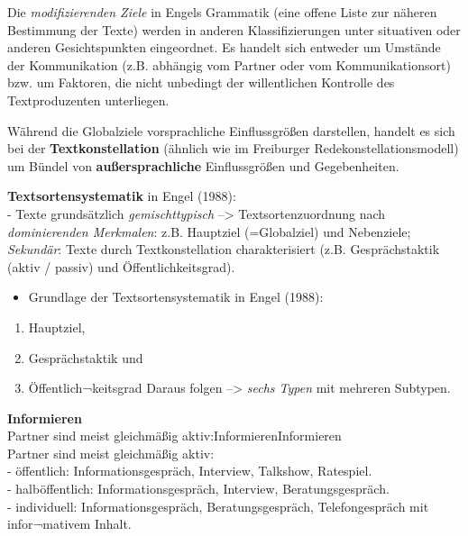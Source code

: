 \documentclass[
  letterpaper,
]{scrbook}
\providecommand{\tightlist}{%
  \setlength{\itemsep}{0pt}\setlength{\parskip}{0pt}}\usepackage{longtable,booktabs,array}
\begin{document}
Die \emph{modifizierenden Ziele} in Engels Grammatik (eine offene Liste
zur näheren Bestimmung der Texte) werden in anderen Klassifizierungen
unter situativen oder anderen Gesichtspunkten eingeordnet. Es handelt
sich entweder um Umstände der Kommunikation (z.B. abhängig vom Partner
oder vom Kommunikationsort) bzw. um Faktoren, die nicht unbedingt der
willentlichen Kontrolle des Textproduzenten unterliegen.

Während die Globalziele vorsprachliche Einflussgrößen darstellen,
handelt es sich bei der \textbf{Textkonstellation} (ähnlich wie im
Freiburger Redekonstellationsmodell) um Bündel von
\textbf{außersprachliche} Einflussgrößen und Gegebenheiten.

\textbf{Textsortensystematik} in Engel (1988):\\
- Texte grundsätzlich \emph{gemischttypisch} --\textgreater{}
Textsortenzuordnung nach \emph{dominierenden Merkmalen}: z.B. Hauptziel
(=Globalziel) und Nebenziele; \emph{Sekundär}: Texte durch
Textkonstellation charakterisiert (z.B. Gesprächstaktik (aktiv / passiv)
und Öffentlichkeitsgrad).\\

\begin{itemize}
\tightlist
\item
  Grundlage der Textsortensystematik in Engel (1988):\\
\end{itemize}

\begin{enumerate}
\def\labelenumi{(\alph{enumi})}
\tightlist
\item
  Hauptziel,\\
\item
  Gesprächstaktik und\\
\item
  Öffentlich¬keitsgrad Daraus folgen --\textgreater{} \emph{sechs Typen}
  mit mehreren Subtypen.
\end{enumerate}

\textbf{Informieren}\\
Partner sind meist gleichmäßig aktiv:InformierenInformieren\\
Partner sind meist gleichmäßig aktiv:\\
- öffentlich: Informationsgespräch, Interview, Talkshow, Ratespiel.\\
- halböffentlich: Informationsgespräch, Interview, Beratungsgespräch.\\
- individuell: Informationsgespräch, Beratungsgespräch, Telefongespräch
mit infor¬mativem Inhalt.\\
\end{document}
